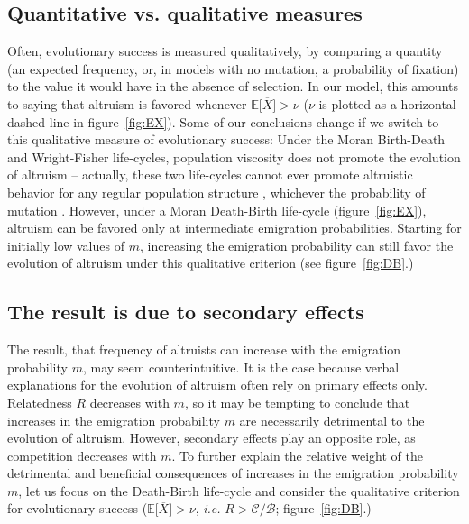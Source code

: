 \documentclass[11pt, letterpaper]{article}
\newcommand{\ie}{\textit{i.e.}}
\newcommand{\Esp}[1]{\mathbb{E}\big[ #1\big]}%
\newcommand{\mutbias}{\nu}
\begin{document}
\subsection*{Quantitative vs. qualitative measures}
Often, evolutionary success is measured qualitatively, by comparing a quantity (an expected frequency, or, in models with no mutation, a probability of fixation) to the value it would have in the absence of selection. In our model, this amounts to saying that altruism is favored whenever $\Esp{\overline{X}} > \mutbias$ ($\mutbias$ is plotted as a horizontal dashed line in figure~\ref{fig:EX}). 
Some of our conclusions change if we switch to this qualitative measure of evolutionary success: Under the Moran Birth-Death and Wright-Fisher life-cycles, population viscosity does not promote the evolution of altruism -- actually, these two life-cycles cannot ever promote altruistic behavior for any regular population structure \citep{Taylor2011}, whichever the probability of mutation \citep{Debarre2017}. 
However, under a Moran Death-Birth life-cycle (figure~\ref{fig:EX}), altruism can be favored only at intermediate emigration probabilities. Starting for initially low values of $m$, increasing the emigration probability can still favor the evolution of altruism under this qualitative criterion (see figure~\ref{fig:DB}.)  

\subsection*{The result is due to secondary effects}
The result, that frequency of altruists can increase with the emigration probability $m$, may seem counterintuitive. It is the case because verbal explanations for the evolution of altruism often rely on primary effects only. Relatedness $R$ decreases with $m$, so it may be tempting to conclude that increases in the emigration probability $m$ are necessarily detrimental to the evolution of altruism. However, secondary effects play an opposite role, as competition decreases with $m$. To further explain the relative weight of the detrimental and beneficial consequences of increases in the emigration probability $m$, let us focus on the Death-Birth life-cycle and consider the qualitative criterion for evolutionary success ($\Esp{\overline{X}}>\nu$, \ie{} $R > \mathcal{C}/\mathcal{B}$; figure~\ref{fig:DB}.)
\end{document}
